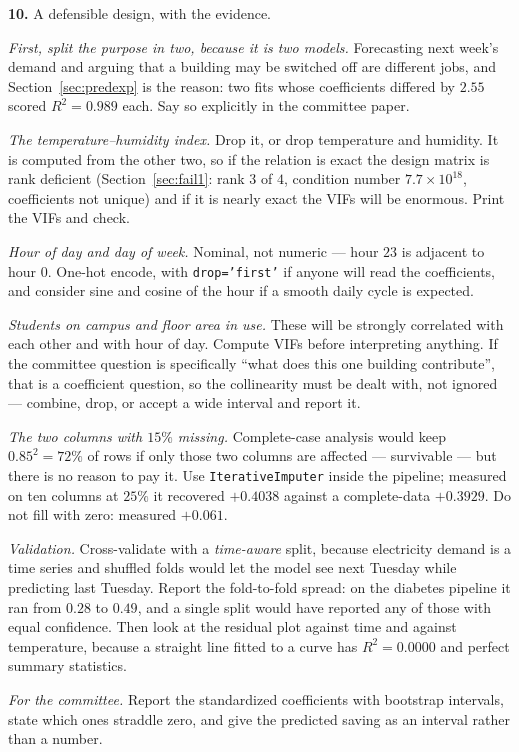 \documentclass[11pt]{article}
\begin{document}
\medskip
\textbf{10.} A defensible design, with the evidence.

\emph{First, split the purpose in two, because it is two models.} Forecasting
next week's demand and arguing that a building may be switched off are
different jobs, and Section~\ref{sec:predexp} is the reason: two fits whose
coefficients differed by $2.55$ scored $R^2 = 0.989$ each. Say so explicitly
in the committee paper.

\emph{The temperature--humidity index.} Drop it, or drop temperature and
humidity. It is computed from the other two, so if the relation is exact the
design matrix is rank deficient (Section~\ref{sec:fail1}: rank $3$ of $4$,
condition number $7.7\times10^{18}$, coefficients not unique) and if it is
nearly exact the VIFs will be enormous. Print the VIFs and check.

\emph{Hour of day and day of week.} Nominal, not numeric --- hour $23$ is
adjacent to hour $0$. One-hot encode, with \texttt{drop='first'} if anyone
will read the coefficients, and consider sine and cosine of the hour if a
smooth daily cycle is expected.

\emph{Students on campus and floor area in use.} These will be strongly
correlated with each other and with hour of day. Compute VIFs before
interpreting anything. If the committee question is specifically ``what does
this one building contribute'', that is a coefficient question, so the
collinearity must be dealt with, not ignored --- combine, drop, or accept a
wide interval and report it.

\emph{The two columns with $15\%$ missing.} Complete-case analysis would keep
$0.85^2 = 72\%$ of rows if only those two columns are affected --- survivable
--- but there is no reason to pay it. Use \texttt{IterativeImputer} inside the
pipeline; measured on ten columns at $25\%$ it recovered $+0.4038$ against a
complete-data $+0.3929$. Do not fill with zero: measured $+0.061$.

\emph{Validation.} Cross-validate with a \emph{time-aware} split, because
electricity demand is a time series and shuffled folds would let the model see
next Tuesday while predicting last Tuesday. Report the fold-to-fold spread:
on the diabetes pipeline it ran from $0.28$ to $0.49$, and a single split
would have reported any of those with equal confidence. Then look at the
residual plot against time and against temperature, because a straight line
fitted to a curve has $R^2 = 0.0000$ and perfect summary statistics.

\emph{For the committee.} Report the standardized coefficients with bootstrap
intervals, state which ones straddle zero, and give the predicted saving as an
interval rather than a number.
\end{document}

